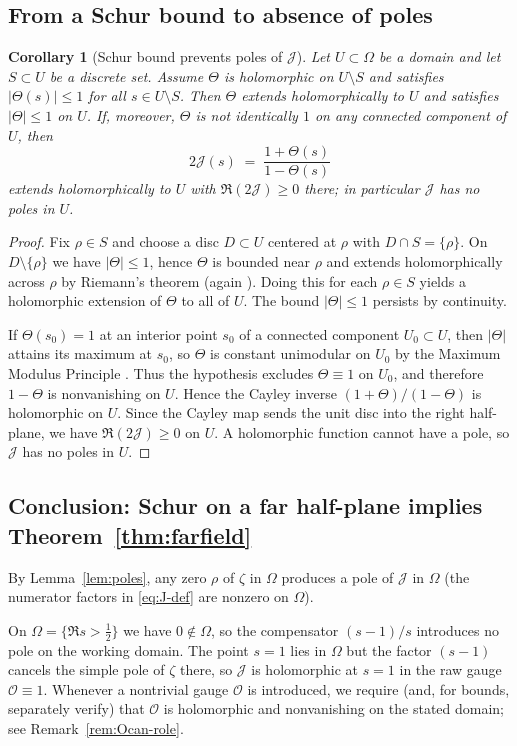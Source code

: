 \documentclass[11pt]{amsart}
\newtheorem{corollary}[theorem]{Corollary}
\theoremstyle{definition}
\theoremstyle{remark}
\begin{document}
\subsection*{From a Schur bound to absence of poles}
\begin{corollary}[Schur bound prevents poles of $\mathcal J$]\label{cor:no-poles}
Let $U\subset\Omega$ be a domain and let $S\subset U$ be a discrete set.
Assume $\Theta$ is holomorphic on $U\setminus S$ and satisfies $|\Theta(s)|\le 1$ for all $s\in U\setminus S$.
Then $\Theta$ extends holomorphically to $U$ and satisfies $|\Theta|\le 1$ on $U$.
If, moreover, $\Theta$ is not identically $1$ on any connected component of $U$, then
\[
  2\mathcal J(s)\;=\;\frac{1+\Theta(s)}{1-\Theta(s)}
\]
extends holomorphically to $U$ with $\Re(2\mathcal J)\ge 0$ there; in particular $\mathcal J$ has no poles in $U$.
\end{corollary}
\begin{proof}
Fix $\rho\in S$ and choose a disc $D\subset U$ centered at $\rho$ with $D\cap S=\{\rho\}$.
On $D\setminus\{\rho\}$ we have $|\Theta|\le 1$, hence $\Theta$ is bounded near $\rho$ and extends holomorphically across $\rho$
by Riemann's theorem (again \cite[Ch.~2]{Ahlfors}).
Doing this for each $\rho\in S$ yields a holomorphic extension of $\Theta$ to all of $U$.
The bound $|\Theta|\le 1$ persists by continuity.

If $\Theta(s_0)=1$ at an interior point $s_0$ of a connected component $U_0\subset U$, then $|\Theta|$ attains its maximum
at $s_0$, so $\Theta$ is constant unimodular on $U_0$ by the Maximum Modulus Principle \cite[Ch.~2]{Ahlfors}.
Thus the hypothesis excludes $\Theta\equiv 1$ on $U_0$, and therefore $1-\Theta$ is nonvanishing on $U$.
Hence the Cayley inverse $(1+\Theta)/(1-\Theta)$ is holomorphic on $U$.
Since the Cayley map sends the unit disc into the right half-plane, we have $\Re(2\mathcal J)\ge 0$ on $U$.
A holomorphic function cannot have a pole, so $\mathcal J$ has no poles in $U$.
\end{proof}

\subsection*{Conclusion: Schur on a far half-plane implies Theorem~\ref{thm:farfield}}
By Lemma~\ref{lem:poles}, any zero $\rho$ of $\zeta$ in $\Omega$ produces a pole of $\mathcal J$ in $\Omega$
(the numerator factors in \eqref{eq:J-def} are nonzero on $\Omega$).

On $\Omega=\{\Re s>\tfrac12\}$ we have $0\notin\Omega$, so the compensator $(s-1)/s$ introduces no pole on the working domain.
The point $s=1$ lies in $\Omega$ but the factor $(s-1)$ cancels the simple pole of $\zeta$ there, so $\mathcal J$ is holomorphic at $s=1$
in the raw gauge $\mathcal O\equiv 1$.
Whenever a nontrivial gauge $\mathcal O$ is introduced, we require (and, for  bounds, separately verify) that $\mathcal O$ is
holomorphic and nonvanishing on the stated domain; see Remark~\ref{rem:Ocan-role}.
\end{document}
